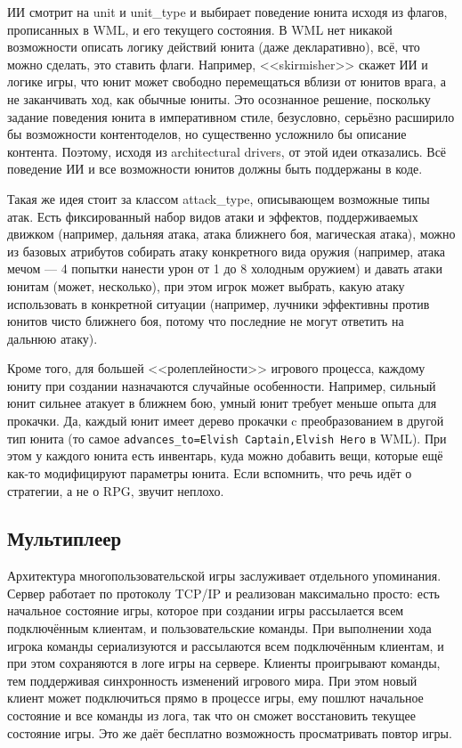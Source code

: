 \documentclass[a5paper]{article}
\begin{document}
ИИ смотрит на unit и unit\_type и выбирает поведение юнита исходя из флагов, прописанных в WML, и его текущего состояния. В WML нет никакой возможности описать логику действий юнита (даже декларативно), всё, что можно сделать, это ставить флаги. Например, <<skirmisher>> скажет ИИ и логике игры, что юнит может свободно перемещаться вблизи от юнитов врага, а не заканчивать ход, как обычные юниты. Это осознанное решение, поскольку задание поведения юнита в императивном стиле, безусловно, серьёзно расширило бы возможности контентоделов, но существенно усложнило бы описание контента. Поэтому, исходя из architectural drivers, от этой идеи отказались. Всё поведение ИИ и все возможности юнитов должны быть поддержаны в коде.

Такая же идея стоит за классом attack\_type, описывающем возможные типы атак. Есть фиксированный набор видов атаки и эффектов, поддерживаемых движком (например, дальняя атака, атака ближнего боя, магическая атака), можно из базовых атрибутов собирать атаку конкретного вида оружия (например, атака мечом --- 4 попытки нанести урон от 1 до 8 холодным оружием) и давать атаки юнитам (может, несколько), при этом игрок может выбрать, какую атаку использовать в конкретной ситуации (например, лучники эффективны против юнитов чисто ближнего боя, потому что последние не могут ответить на дальнюю атаку).

Кроме того, для большей <<ролеплейности>> игрового процесса, каждому юниту при создании назначаются случайные особенности. Например, сильный юнит сильнее атакует в ближнем бою, умный юнит требует меньше опыта для прокачки. Да, каждый юнит имеет дерево прокачки c преобразованием в другой тип юнита (то самое \texttt{advances_to=Elvish Captain,Elvish Hero} в WML). При этом у каждого юнита есть инвентарь, куда можно добавить вещи, которые ещё как-то модифицируют параметры юнита. Если вспомнить, что речь идёт о стратегии, а не о RPG, звучит неплохо.

\subsection{Мультиплеер}

Архитектура многопользовательской игры заслуживает отдельного упоминания. Сервер работает по протоколу TCP/IP и реализован максимально просто: есть начальное состояние игры, которое при создании игры рассылается всем подключённым клиентам, и пользовательские команды. При выполнении хода игрока команды сериализуются и рассылаются всем подключённым клиентам, и при этом сохраняются в логе игры на сервере. Клиенты проигрывают команды, тем поддерживая синхронность изменений игрового мира. При этом новый клиент может подключиться прямо в процессе игры, ему пошлют начальное состояние и все команды из лога, так что он сможет восстановить текущее состояние игры. Это же даёт бесплатно возможность просматривать повтор игры.
\end{document}
